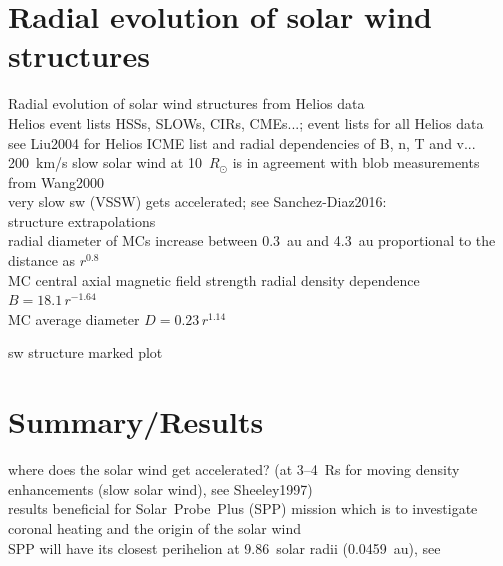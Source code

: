\section{Radial evolution of solar wind structures}


Radial evolution of solar wind structures from Helios data\\

Helios event lists HSSs, SLOWs, CIRs, CMEs...; event lists for all Helios data\\
see Liu2004 for Helios ICME list and radial dependencies of B, n, T and v...\\

200~km/s slow solar wind at 10~$R_\odot$ is in agreement with blob measurements from Wang2000\\

very slow sw (VSSW) gets accelerated; see Sanchez-Diaz2016:\\

structure extrapolations\\

radial diameter of MCs increase between 0.3~au and 4.3~au proportional to the distance as $r^{0.8}$ \citep{Bothmer1998}\\

MC central axial magnetic field strength radial density dependence $B = 18.1\,r^{-1.64}$ \citet{Leitner2007}\\
MC average diameter $D = 0.23\,r^{1.14}$ \citet{Leitner2007}

sw structure marked plot\\


\section{Summary/Results}

where does the solar wind get accelerated? (at 3--4~Rs for moving density enhancements (slow solar wind), see Sheeley1997)\\
results beneficial for Solar~Probe~Plus (SPP) mission which is to investigate coronal heating and the origin of the solar wind\\
SPP will have its closest perihelion at 9.86~solar radii (0.0459~au), see \citet{Fox2015}\\
